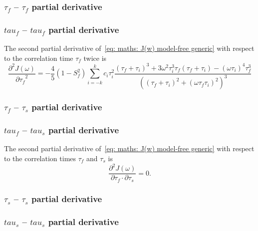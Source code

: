 \begin{latexonly}
    \subsubsection{$\tau_f$ -- $\tau_f$ partial derivative}
\end{latexonly}
\begin{htmlonly}
    \subsubsection{$tau_f$ -- $tau_f$ partial derivative}
\end{htmlonly}

The second partial derivative of~\eqref{eq: maths: J(w) model-free generic} with respect to the correlation time $\tau_f$ twice is
\begin{equation}
    \frac{\partial^2 J(\omega)}{{\partial \tau_f}^2} = -\frac{4}{5} (1 - S^2_f) \sum_{i=-k}^k c_i \tau_i^2
        \frac{(\tau_f + \tau_i)^3  +  3 \omega^2 \tau_i^3 \tau_f (\tau_f + \tau_i)  -  (\omega \tau_i)^4 \tau_f^3}
            {\left((\tau_f + \tau_i)^2 + (\omega \tau_f \tau_i)^2 \right)^3}
\end{equation}



\begin{latexonly}
    \subsubsection{$\tau_f$ -- $\tau_s$ partial derivative}
\end{latexonly}
\begin{htmlonly}
    \subsubsection{$tau_f$ -- $tau_s$ partial derivative}
\end{htmlonly}

The second partial derivative of~\eqref{eq: maths: J(w) model-free generic} with respect to the correlation times $\tau_f$ and $\tau_s$ is
\begin{equation}
    \frac{\partial^2 J(\omega)}{\partial \tau_f \cdot \partial \tau_s} = 0.
\end{equation}



\begin{latexonly}
    \subsubsection{$\tau_s$ -- $\tau_s$ partial derivative}
\end{latexonly}
\begin{htmlonly}
    \subsubsection{$tau_s$ -- $tau_s$ partial derivative}
\end{htmlonly}

